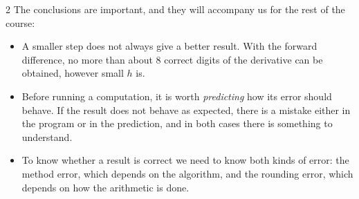 \begin{paracol}{2}
The conclusions are important, and they will accompany us for the rest of the course:
\begin{itemize}
\item A smaller step does not always give a better result. With the forward difference, no more than about 8 correct digits of the derivative can be obtained, however small $h$ is.
\item Before running a computation, it is worth \emph{predicting} how its error should behave. If the result does not behave as expected, there is a mistake either in the program or in the prediction, and in both cases there is something to understand.
\item To know whether a result is correct we need to know both kinds of error: the method error, which depends on the algorithm, and the rounding error, which depends on how the arithmetic is done.
\end{itemize}
\end{paracol}

